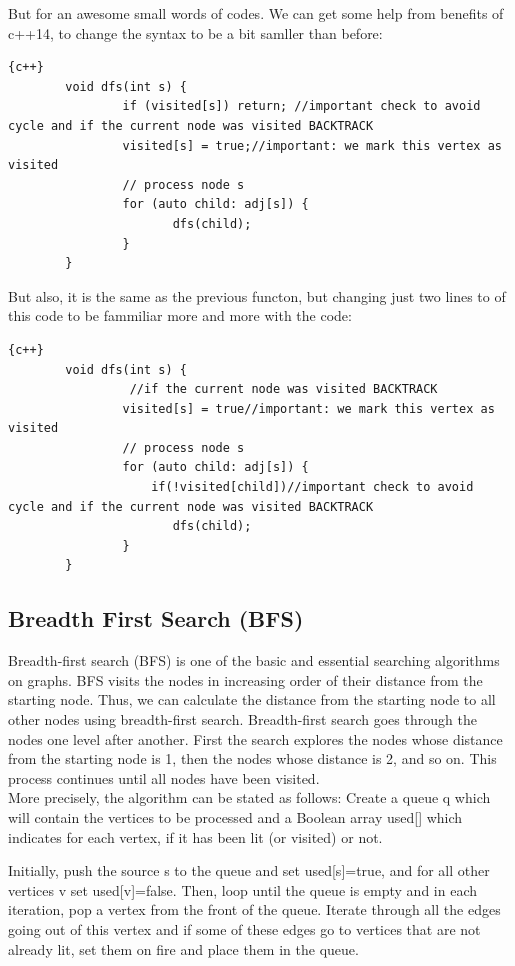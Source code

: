But for an awesome small words of codes. We can get some help from benefits of c++14, to change the syntax to be a bit samller than before:
\begin{lstlisting}{c++}
        void dfs(int s) {
                if (visited[s]) return; //important check to avoid cycle and if the current node was visited BACKTRACK 
                visited[s] = true;//important: we mark this vertex as visited
                // process node s
                for (auto child: adj[s]) {
                       dfs(child);
                }
        }
\end{lstlisting}
\newpage 
But also, it is the same as the previous functon, but changing just two lines to of this code to be fammiliar more and more with the code:
\begin{lstlisting}{c++}
        void dfs(int s) {
                 //if the current node was visited BACKTRACK 
                visited[s] = true//important: we mark this vertex as visited
                // process node s
                for (auto child: adj[s]) {
                    if(!visited[child])//important check to avoid cycle and if the current node was visited BACKTRACK 
                       dfs(child);
                }
        }
\end{lstlisting}

\newpage 

\subsection{Breadth First Search (BFS)}\label{subsec:BFS}
Breadth-first search (BFS) is one of the basic and essential searching algorithms on graphs. BFS visits the nodes in increasing order of their distance from the starting node. Thus, we can calculate the distance from the starting node to all other nodes using breadth-first search. Breadth-first search goes through the nodes one level after another. First the search explores the nodes whose distance from the starting node is 1, then the nodes whose distance is 2, and so on. This process continues until all nodes have been visited.\\
More precisely, the algorithm can be stated as follows: Create a queue q which will contain the vertices to be processed and a Boolean array used[] which indicates for each vertex, if it has been lit (or visited) or not.

Initially, push the source s to the queue and set used[s]=true, and for all other vertices v set used[v]=false. Then, loop until the queue is empty and in each iteration, pop a vertex from the front of the queue. Iterate through all the edges going out of this vertex and if some of these edges go to vertices that are not already lit, set them on fire and place them in the queue.

